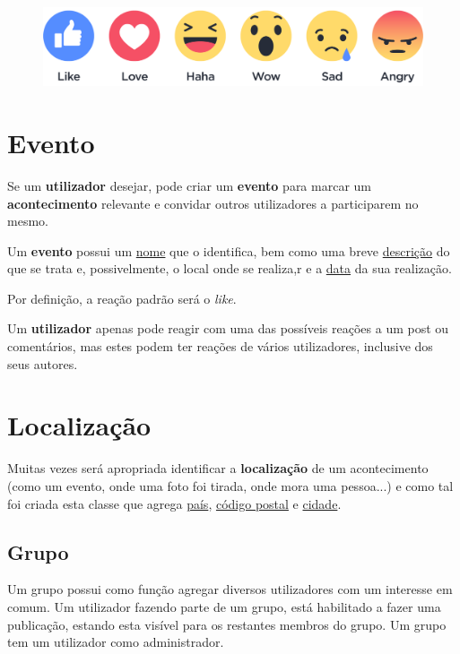 \documentclass[12pt]{report}
\begin{document}
\begin{figure}[H]
    \centering
    \includegraphics[width=\textwidth]{reactions}
\end{figure}

\section{Evento}

Se um \textbf{utilizador} desejar, pode criar um \textbf{evento} para marcar um \textbf{acontecimento} relevante e convidar outros utilizadores a participarem no mesmo. \par

Um \textbf{evento} possui um \underline{nome} que o identifica, bem como uma breve \underline{descrição} do que se trata e, possivelmente, o local onde se realiza,r e a \underline{data} da sua realização.

Por definição, a reação padrão será o \textit{like}. \par

Um \textbf{utilizador} apenas pode reagir com uma das possíveis reações a um post ou comentários, mas estes podem ter reações de vários utilizadores, inclusive dos seus autores.

\section{Localização}

Muitas vezes será apropriada identificar a \textbf{localização} de um acontecimento (como um evento, onde uma foto foi tirada, onde mora uma pessoa...) e como tal foi criada esta classe que agrega \underline{país}, \underline{código postal} e \underline{cidade}.

\subsection{Grupo}

Um grupo possui como função agregar diversos utilizadores com um interesse em comum. Um utilizador fazendo parte de um grupo, está habilitado a fazer uma publicação, estando esta visível para os restantes membros do grupo. Um grupo tem um utilizador como administrador.
\end{document}
